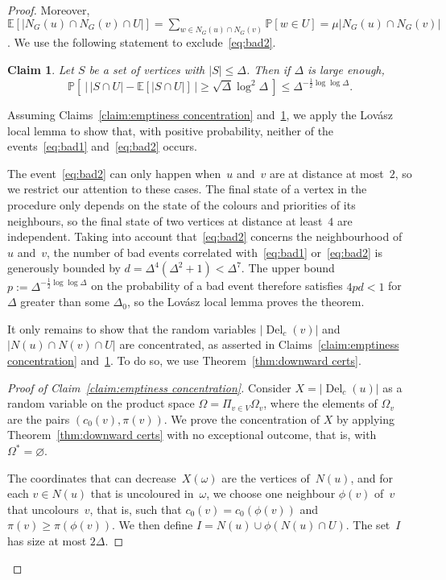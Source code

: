 \documentclass[11pt]{article}
\theoremstyle{plain}
\newcounter{claimcount}
\newtheorem{claim}[claimcount]{Claim}
\DeclareMathOperator{\Del}{Del}
\newcommand{\del}{\Del_c}
\newcommand{\Prob}{\mathbb{P}}
\newcommand{\E}{\mathbb{E}}
\begin{document}
\begin{proof}
Moreover,
$\E[|N_G(u)\cap N_G(v)\cap U|]=\sum_{w\in N_G(u)\cap N_G(v)}\Prob[w\in U]=\mu|N_G(u)\cap N_G(v)|$.
We use the following statement to exclude~\eqref{eq:bad2}.
\begin{claim}\label{claim:set concentration}
  Let $S$ be a set of vertices with $|S|\le \Delta$.
  Then if $\Delta$ is large enough,
    \[
    \Prob[~\left|\,|S\cap U|-\E[|S\cap U|]\,\right| \ge
      \sqrt{\Delta}\log^2\Delta~]\le\Delta^{-\frac{1}{2}\log\log\Delta}.
    \]
\end{claim}
Assuming Claims~\ref{claim:emptiness concentration} and~\ref{claim:set concentration},
we apply the Lov\'asz local lemma to show that, with positive probability, neither of the events~\eqref{eq:bad1} and~\eqref{eq:bad2} occurs.

The event~\eqref{eq:bad2} can only happen when~$u$ and~$v$ are at distance at most~$2$, so we restrict our attention to these cases.
The final state of a vertex in the procedure only depends on the state of the colours and priorities of its neighbours, so the final state of two vertices at distance at least~$4$ are independent.
Taking into account that~\eqref{eq:bad2} concerns the neighbourhood of~$u$ and~$v$,
the number of bad events correlated with~\eqref{eq:bad1} or~\eqref{eq:bad2}
is generously bounded by $d=\Delta^4(\Delta^2+1)<\Delta^7$.
The upper bound $p:=\Delta^{-\frac{1}{2}\log\log\Delta}$ on the probability of a bad event therefore satisfies
$4pd<1$ for $\Delta$ greater than some $\Delta_0$,
so the Lov\'asz local lemma proves the theorem.

It only remains to show that the random variables $|\del(v)|$ and $|N(u)\cap N(v)\cap U|$
are concentrated, as asserted in Claims~\ref{claim:emptiness concentration}
and~\ref{claim:set concentration}.
To do so, we use Theorem~\ref{thm:downward certs}.

\begin{proof}[Proof of Claim~\ref{claim:emptiness concentration}]
  Consider $X=|\del(u)|$ as a random variable on the product space
  $\Omega=\Pi_{v\in V}\Omega_v$,
  where the elements of $\Omega_v$ are the pairs $(c_0(v), \pi(v))$.
  We prove the concentration of $X$ by applying
  Theorem~\ref{thm:downward certs} with no exceptional outcome,
  that is, with $\Omega^*=\varnothing$.

  The coordinates that can decrease~$X(\omega)$ are the vertices of~$N(u)$,
  and for each $v\in N(u)$ that is uncoloured in~$\omega$,
  we choose one neighbour $\phi(v)$ of~$v$ that uncolours~$v$,
  that is, such that $c_0(v)=c_0(\phi(v))$ and $\pi(v)\ge \pi(\phi(v))$.
  We then define $I=N(u)\cup\phi(N(u)\cap U)$.
  The set~$I$ has size at most $2\Delta$. 


\end{proof}
\end{proof}
\end{document}
